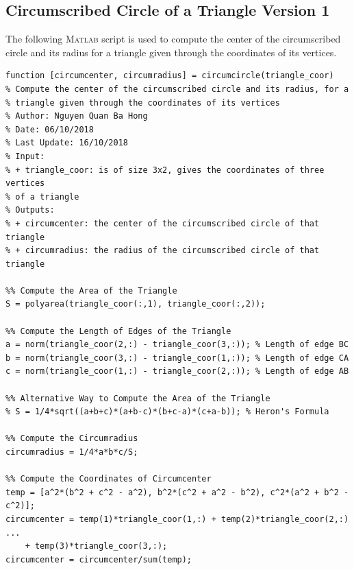 \documentclass[11pt,a4paper,center,notitlepage]{article}
\numberwithin{equation}{section}
\begin{document}
\subsection{Circumscribed Circle of a Triangle Version 1}\label{sec5.4}
The following \textsc{Matlab} script is used to compute the center of the circumscribed circle and its radius for a triangle given through the coordinates of its vertices.
\begin{verbatim}
function [circumcenter, circumradius] = circumcircle(triangle_coor)
% Compute the center of the circumscribed circle and its radius, for a
% triangle given through the coordinates of its vertices
% Author: Nguyen Quan Ba Hong
% Date: 06/10/2018
% Last Update: 16/10/2018
% Input:
% + triangle_coor: is of size 3x2, gives the coordinates of three vertices
% of a triangle
% Outputs:
% + circumcenter: the center of the circumscribed circle of that triangle
% + circumradius: the radius of the circumscribed circle of that triangle

%% Compute the Area of the Triangle
S = polyarea(triangle_coor(:,1), triangle_coor(:,2));

%% Compute the Length of Edges of the Triangle
a = norm(triangle_coor(2,:) - triangle_coor(3,:)); % Length of edge BC
b = norm(triangle_coor(3,:) - triangle_coor(1,:)); % Length of edge CA
c = norm(triangle_coor(1,:) - triangle_coor(2,:)); % Length of edge AB

%% Alternative Way to Compute the Area of the Triangle
% S = 1/4*sqrt((a+b+c)*(a+b-c)*(b+c-a)*(c+a-b)); % Heron's Formula

%% Compute the Circumradius
circumradius = 1/4*a*b*c/S;

%% Compute the Coordinates of Circumcenter
temp = [a^2*(b^2 + c^2 - a^2), b^2*(c^2 + a^2 - b^2), c^2*(a^2 + b^2 - c^2)];
circumcenter = temp(1)*triangle_coor(1,:) + temp(2)*triangle_coor(2,:) ...
    + temp(3)*triangle_coor(3,:);
circumcenter = circumcenter/sum(temp);
\end{verbatim}
\end{document}
